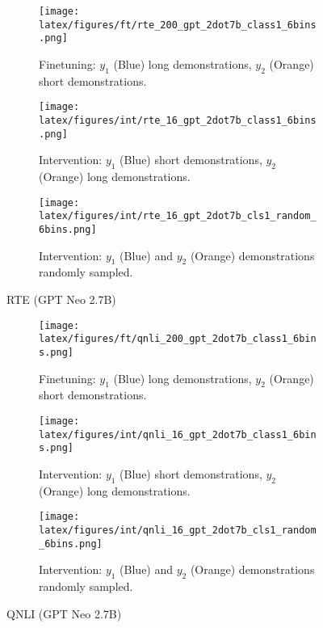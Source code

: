 \begin{figure*}[t!]
    \centering
    \begin{minipage}[t]{\linewidth}
        \begin{subfigure}{0.31\linewidth}
            \centering
            \texttt{[image: latex/figures/ft/rte\_200\_gpt\_2dot7b\_class1\_6bins.png]}
            \caption{Finetuning: $y_1$ (Blue) long demonstrations, $y_2$ (Orange) short demonstrations.}
        \end{subfigure}%
        \hfill
        \begin{subfigure}{0.31\linewidth}
            \centering
            \texttt{[image: latex/figures/int/rte\_16\_gpt\_2dot7b\_class1\_6bins.png]}
            \caption{Intervention: $y_1$ (Blue) short demonstrations, $y_2$ (Orange) long demonstrations.}
        \end{subfigure}
        \hfill
        \begin{subfigure}{0.31\linewidth}
            \centering
            \texttt{[image: latex/figures/int/rte\_16\_gpt\_2dot7b\_cls1\_random\_6bins.png]}
            \caption{Intervention: $y_1$ (Blue) and $y_2$ (Orange) demonstrations randomly sampled.}
        \end{subfigure}
    \end{minipage}%
    \hfill
    \begin{minipage}[c]{\linewidth}
        \caption{RTE (GPT Neo 2.7B)}
    \end{minipage}
\end{figure*}

\begin{figure*}[t!]
    \centering
    \begin{minipage}[t]{\linewidth}
        \begin{subfigure}{0.31\linewidth}
            \centering
            \texttt{[image: latex/figures/ft/qnli\_200\_gpt\_2dot7b\_class1\_6bins.png]}
            \caption{Finetuning: $y_1$ (Blue) long demonstrations, $y_2$ (Orange) short demonstrations.}
        \end{subfigure}%
        \hfill
        \begin{subfigure}{0.31\linewidth}
            \centering
            \texttt{[image: latex/figures/int/qnli\_16\_gpt\_2dot7b\_class1\_6bins.png]}
            \caption{Intervention: $y_1$ (Blue) short demonstrations, $y_2$ (Orange) long demonstrations.}
        \end{subfigure}
        \hfill
        \begin{subfigure}{0.31\linewidth}
            \centering
            \texttt{[image: latex/figures/int/qnli\_16\_gpt\_2dot7b\_cls1\_random\_6bins.png]}
            \caption{Intervention: $y_1$ (Blue) and $y_2$ (Orange) demonstrations randomly sampled.}
        \end{subfigure}
    \end{minipage}%
    \hfill
    \begin{minipage}[c]{\linewidth}
        \caption{QNLI (GPT Neo 2.7B)}
    \end{minipage}
\end{figure*}

